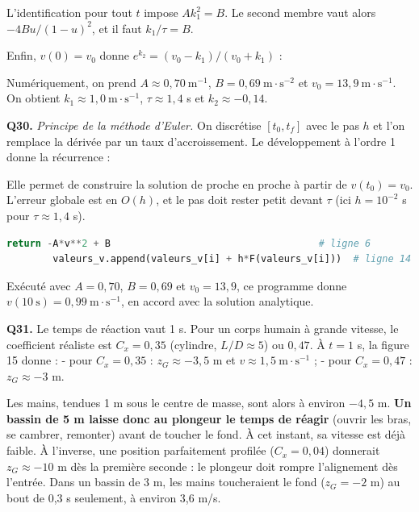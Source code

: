\documentclass[11pt,a4paper]{article}
\newcommand{\equationajustee}[1]{%
  \sbox{\boiteequation}{$\displaystyle #1$}%
  \ifdim\wd\boiteequation>\linewidth
    \[\resizebox{\linewidth}{!}{\usebox{\boiteequation}}\]%
  \else
    \[#1\]%
  \fi}
\begin{document}
L'identification pour tout \(t\) impose \(A k_1^2 = B\). Le second membre vaut alors \(-4Bu/(1-u)^2\), et il faut \(k_1/\tau = B\).

Enfin, \(v(0) = v_0\) donne \(e^{k_2} = (v_0 - k_1)/(v_0 + k_1)\) :

\equationajustee{\boxed{\begin{aligned}
k_1 &= \sqrt{\frac{B}{A}} = v_{\text{lim}} \\
\tau &= \frac{1}{\sqrt{AB}} \\
k_2 &= \ln\left(\frac{v_0 - \sqrt{B/A}}{v_0 + \sqrt{B/A}}\right) < 0
\end{aligned}}}

Numériquement, on prend \(A \approx 0{,}70\ \mathrm{m^{-1}}\), \(B = 0{,}69\ \mathrm{m\cdot s^{-2}}\) et \(v_0 = 13{,}9\ \mathrm{m\cdot s^{-1}}\). On obtient \(k_1 \approx 1{,}0\ \mathrm{m\cdot s^{-1}}\), \(\tau \approx 1{,}4\) s et \(k_2 \approx -0{,}14\).

\textbf{Q30.} \emph{Principe de la méthode d'Euler.} On discrétise \([t_0, t_f]\) avec le pas \(h\) et l'on remplace la dérivée par un taux d'accroissement. Le développement à l'ordre 1 donne la récurrence :

\equationajustee{v(t_{i+1}) \simeq v(t_i) + h\,F(v(t_i))}

Elle permet de construire la solution de proche en proche à partir de \(v(t_0) = v_0\). L'erreur globale est en \(O(h)\), et le pas doit rester petit devant \(\tau\) (ici \(h = 10^{-2}\) s pour \(\tau \approx 1{,}4\) s).

\begin{lstlisting}[language=Python]
    return -A*v**2 + B                                    # ligne 6
        valeurs_v.append(valeurs_v[i] + h*F(valeurs_v[i]))  # ligne 14
\end{lstlisting}

Exécuté avec \(A = 0{,}70\), \(B = 0{,}69\) et \(v_0 = 13{,}9\), ce programme donne \(v(10\ \mathrm s) = 0{,}99\ \mathrm{m\cdot s^{-1}}\), en accord avec la solution analytique.

\textbf{Q31.} Le temps de réaction vaut 1 s. Pour un corps humain à grande vitesse, le coefficient réaliste est \(C_x = 0{,}35\) (cylindre, \(L/D \approx 5\)) ou \(0{,}47\). À \(t = 1\) s, la figure 15 donne :
- pour \(C_x = 0{,}35\) : \(z_G \approx -3{,}5\) m et \(v \approx 1{,}5\ \mathrm{m\cdot s^{-1}}\) ;
- pour \(C_x = 0{,}47\) : \(z_G \approx -3\) m.

Les mains, tendues 1 m sous le centre de masse, sont alors à environ \(-4{,}5\) m. \textbf{Un bassin de 5 m laisse donc au plongeur le temps de réagir} (ouvrir les bras, se cambrer, remonter) avant de toucher le fond. À cet instant, sa vitesse est déjà faible. À l'inverse, une position parfaitement profilée (\(C_x = 0{,}04\)) donnerait \(z_G \approx -10\) m dès la première seconde : le plongeur doit rompre l'alignement dès l'entrée. Dans un bassin de 3 m, les mains toucheraient le fond (\(z_G = -2\) m) au bout de 0,3 s seulement, à environ 3,6 m/s.
\end{document}

